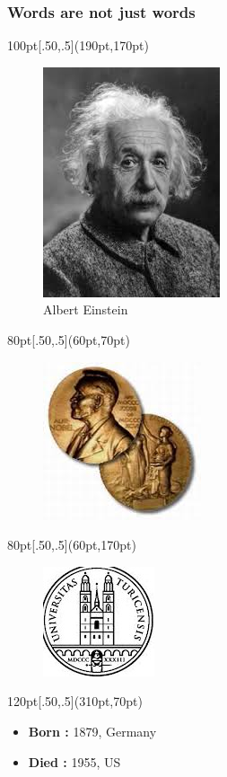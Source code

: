 \begin{frame}
 \frametitle{Words are not just words}
\begin{textblock*}{100pt}[.50,.5](190pt,170pt)
\begin{figure}[h]
 \centering
 \includegraphics[bb=0 0 197 256,scale=0.5]{./einstein.jpg}
 \caption{Albert Einstein}
\end{figure}
\end{textblock*}
\begin{textblock*}{80pt}[.50,.5](60pt,70pt)
\begin{figure}[h]
 \centering
 \includegraphics[bb=0 0 197 256,scale=0.5]{./nobel.jpg}
\end{figure}
\end{textblock*}

\begin{textblock*}{80pt}[.50,.5](60pt,170pt)
\begin{figure}[h]
 \centering
 \includegraphics[bb=0 0 197 256,scale=0.5]{./zurich.jpg}
\end{figure}
\end{textblock*}


\begin{textblock*}{120pt}[.50,.5](310pt,70pt)
\begin{itemize} 
\item \textbf{Born :} 1879, Germany
\item \textbf{Died :} 1955, US
 \end{itemize}
\end{textblock*}
\end{frame}
